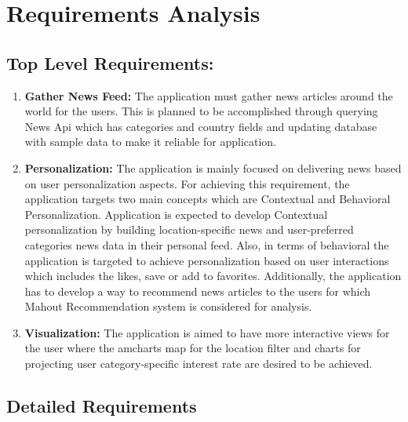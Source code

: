 \chapter{Requirements Analysis}
\section{Top Level Requirements:}
\begin{enumerate}
   
\item{\bf Gather News Feed: }
 The application must gather news articles around the world for the users. This is planned to be accomplished through querying News Api which has categories and country fields and updating database with sample data to make it reliable for application.
 \item{\bf Personalization: }
 The application is mainly focused on delivering news based on user personalization aspects. For achieving this requirement, the application targets two main concepts\cite{authentic.} which are Contextual and Behavioral Personalization. 
 Application is expected to develop Contextual personalization by building location-specific news and user-preferred categories news data in their personal feed.
 Also, in terms of behavioral the application is targeted to achieve personalization based on user interactions which includes the likes, save or add to favorites.
 Additionally, the application has to develop a way to recommend news articles to the users for which Mahout Recommendation system is considered for analysis.
 
 \item{\bf Visualization: }
 The application is aimed to have more interactive views for the user where the amcharts map for the location filter and charts for projecting user category-specific interest rate are desired to be achieved.

\end{enumerate}
 \section{Detailed Requirements}
 
